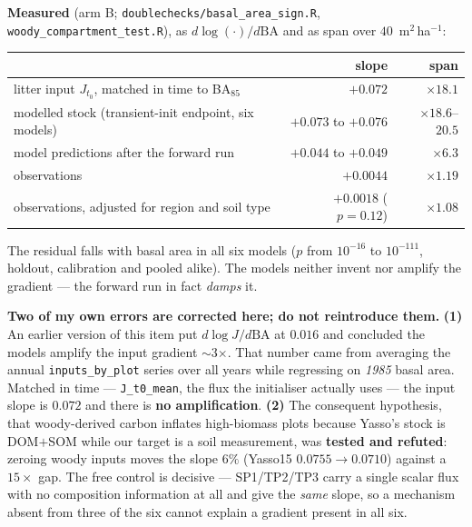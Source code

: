 \documentclass[11pt]{article}
\begin{document}
\noindent\textbf{Measured} (arm B; \texttt{doublechecks/basal\_area\_sign.R},
\texttt{woody\_compartment\_test.R}), as $d\log(\cdot)/d\mathrm{BA}$ and as span over
$40$~m$^2$\,ha$^{-1}$:

\begin{center}\small
\begin{tabular}{lrr}
\toprule
 & slope & span\\
\midrule
litter input $J_{t_0}$, matched in time to BA$_{85}$ & $+0.072$ & $\times 18.1$\\
modelled stock (transient-init endpoint, six models) & $+0.073$ to $+0.076$ & $\times 18.6$--$20.5$\\
model predictions after the forward run & $+0.044$ to $+0.049$ & $\times 6.3$\\
observations & $+0.0044$ & $\times 1.19$\\
observations, adjusted for region and soil type & $+0.0018$ ($p=0.12$) & $\times 1.08$\\
\bottomrule
\end{tabular}
\end{center}

\noindent The residual falls with basal area in all six models ($p$ from $10^{-16}$ to $10^{-111}$,
holdout, calibration and pooled alike). The models neither invent nor amplify the gradient --- the
forward run in fact \emph{damps} it.

\begin{caveat}
\textbf{Two of my own errors are corrected here; do not reintroduce them.}
\textbf{(1)} An earlier version of this item put $d\log J/d\mathrm{BA}$ at $0.016$ and concluded the
models amplify the input gradient $\sim$3$\times$. That number came from averaging the annual
\texttt{inputs\_by\_plot} series over all years while regressing on \emph{1985} basal area. Matched in
time --- \texttt{J\_t0\_mean}, the flux the initialiser actually uses --- the input slope is $0.072$
and there is \textbf{no amplification}.
\textbf{(2)} The consequent hypothesis, that woody-derived carbon inflates high-biomass plots because
Yasso's stock is DOM${+}$SOM while our target is a soil measurement, was \textbf{tested and refuted}:
zeroing woody inputs moves the slope $6\%$ (Yasso15 $0.0755 \to 0.0710$) against a $15\times$ gap.
The free control is decisive --- SP1/TP2/TP3 carry a single scalar flux with no composition
information at all and give the \emph{same} slope, so a mechanism absent from three of the six cannot
explain a gradient present in all six.
\end{caveat}
\end{document}
